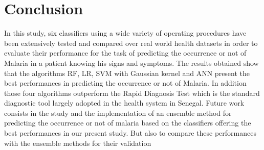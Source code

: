 \section{Conclusion}\label{conclusion}
In this study, six classifiers using a wide variety of operating procedures have been extensively tested and compared over real world health datasets in order to evaluate their performance for the task of predicting the occurrence or not of Malaria in a patient knowing his signs and symptoms. The results obtained show that the algorithms RF, LR,
SVM with Gaussian kernel and ANN present the best performances in predicting the occurrence or not of Malaria. In addition those four algorithms outperform the Rapid Diagnosis Test which is the standard diagnostic tool largely adopted in the health system in
Senegal. Future work consists in the study and the implementation of an ensemble method for predicting the occurrence or not of malaria based on the classifiers offering the best performances in our present study. But also to compare these performances with the ensemble methods for their validation
